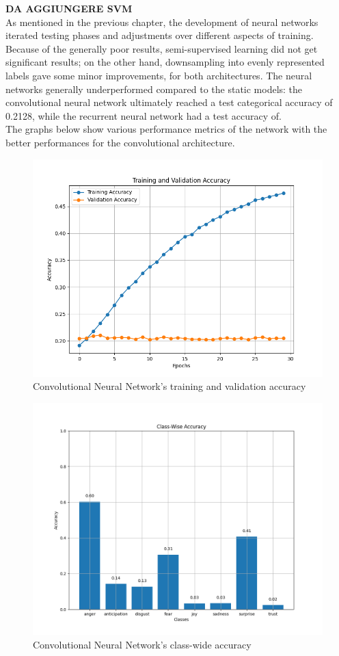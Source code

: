 \textbf{DA AGGIUNGERE SVM}\\


As mentioned in the previous chapter, the development of neural networks
iterated testing phases and adjustments over different aspects of training.
Because of the generally poor results, semi-supervised learning did not get
significant results; on the other hand, downsampling into evenly represented
labels gave some minor improvements, for both architectures.
The neural networks generally underperformed compared to the static models:
the convolutional neural network ultimately reached a test categorical accuracy
of 0.2128, while the recurrent neural network had a test accuracy of.\\

The graphs below show various performance metrics of the network with the better
performances for the convolutional architecture.
\begin{figure}[H]
    \centering
    \includegraphics[width=0.7\linewidth]{pictures/cnn_accuracy.png}
    \caption{Convolutional Neural Network's training and validation accuracy}
    \label{fig:cnn_train_val_acc}
\end{figure}

\begin{figure}[H]
    \centering
    \includegraphics[width=0.8\linewidth]{pictures/cnn_class_accuracy.png}
    \caption{Convolutional Neural Network's class-wide accuracy}
    \label{fig:cnn_classacc}
\end{figure}

